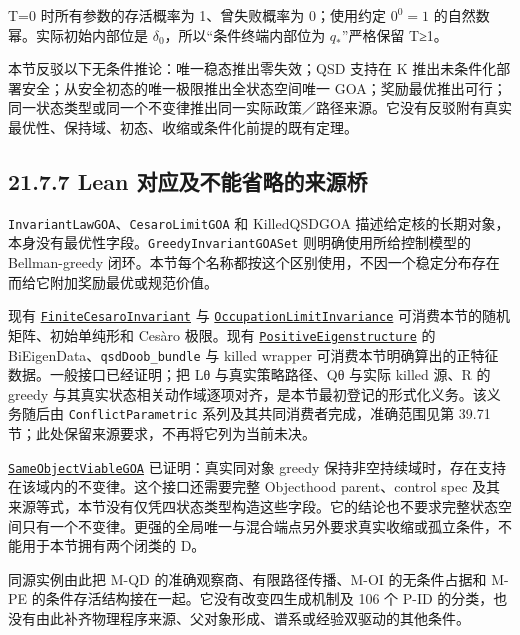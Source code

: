 \documentclass[
  11pt,
  oneside]{book}
\begin{document}
T=0 时所有参数的存活概率为 1、曾失败概率为 0；使用约定 \(0^0=1\) 的自然数幂。实际初始内部位是 \(\delta_0\)，所以``条件终端内部位为 \(q_*\)''严格保留 T≥1。

本节反驳以下无条件推论：唯一稳态推出零失效；QSD 支持在 K 推出未条件化部署安全；从安全初态的唯一极限推出全状态空间唯一 GOA；奖励最优推出可行；同一状态类型或同一个不变律推出同一实际政策／路径来源。它没有反驳附有真实最优性、保持域、初态、收缩或条件化前提的既有定理。

\subsection{21.7.7 Lean 对应及不能省略的来源桥}\label{lean-ux5bf9ux5e94ux53caux4e0dux80fdux7701ux7565ux7684ux6765ux6e90ux6865}

\nolinkurl{InvariantLawGOA}、\nolinkurl{CesaroLimitGOA} 和 KilledQSDGOA 描述给定核的长期对象，本身没有最优性字段。\nolinkurl{GreedyInvariantGOASet} 则明确使用所给控制模型的 Bellman-greedy 闭环。本节每个名称都按这个区别使用，不因一个稳定分布存在而给它附加奖励最优或规范价值。

现有 \href{../formalization/ueot-core/UEOT/V3/FiniteCesaroInvariant.lean}{\nolinkurl{FiniteCesaroInvariant}} 与 \href{../formalization/ueot-core/UEOT/V3/Compression/OccupationLimitInvariance.lean}{\nolinkurl{OccupationLimitInvariance}} 可消费本节的随机矩阵、初始单纯形和 Cesàro 极限。现有 \href{../formalization/ueot-core/UEOT/V3/Compression/PositiveEigenstructure.lean}{\nolinkurl{PositiveEigenstructure}} 的 BiEigenData、\nolinkurl{qsdDoob_bundle} 与 killed wrapper 可消费本节明确算出的正特征数据。一般接口已经证明；把 Lθ 与真实策略路径、Qθ 与实际 killed 源、R 的 greedy 与其真实状态相关动作域逐项对齐，是本节最初登记的形式化义务。该义务随后由 \nolinkurl{ConflictParametric} 系列及其共同消费者完成，准确范围见第 39.71 节；此处保留来源要求，不再将它列为当前未决。

\href{../formalization/ueot-core/UEOT/V3/Compression/TheoryCompletion/SameObjectViableGOA.lean}{\nolinkurl{SameObjectViableGOA}} 已证明：真实同对象 greedy 保持非空持续域时，存在支持在该域内的不变律。这个接口还需要完整 Objecthood parent、control spec 及其来源等式，本节没有仅凭四状态类型构造这些字段。它的结论也不要求完整状态空间只有一个不变律。更强的全局唯一与混合端点另外要求真实收缩或孤立条件，不能用于本节拥有两个闭类的 D。

同源实例由此把 M-QD 的准确观察商、有限路径传播、M-OI 的无条件占据和 M-PE 的条件存活结构接在一起。它没有改变四生成机制及 106 个 P-ID 的分类，也没有由此补齐物理程序来源、父对象形成、谱系或经验双驱动的其他条件。
\end{document}
